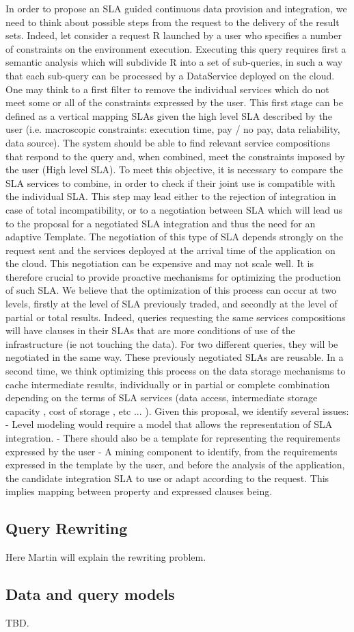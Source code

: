 In order to propose an SLA guided continuous data provision and integration, we need to think about possible steps from the request to the delivery of the result sets. Indeed, let consider a request R launched by a user who specifies a number of constraints on the environment execution. Executing this query requires first a semantic analysis which will subdivide R into a set of sub-queries, in such a way that each sub-query can be processed by a DataService deployed on the cloud. One may think to a first filter to remove the individual services which do not meet some or all of the constraints expressed by the user. This first stage can be defined as a vertical mapping SLAs given the high level SLA described by the user (i.e. macroscopic constraints: execution time, pay / no pay, data reliability, data source). The system should be able to find relevant service compositions that respond to the query and, when combined, meet the constraints imposed by the user (High level SLA).
To meet this objective, it is necessary to compare the SLA services to combine, in order to check if their joint use is compatible with the individual SLA. This step may lead either to the rejection of integration in case of total incompatibility, or to a negotiation between SLA which will lead us to the proposal for a negotiated SLA integration and thus the need for an adaptive Template.
The negotiation of this type of SLA depends strongly on the request sent and the services deployed at the arrival time of the application on the cloud. This negotiation can be expensive and may not scale well. It is therefore crucial to provide proactive mechanisms for optimizing the production of such SLA. We believe that the optimization of this process can occur at two levels, firstly at the level of SLA previously traded, and secondly at the level of partial or total results. Indeed, queries requesting the same services compositions will have clauses in their SLAs that are more conditions of use of the infrastructure (ie not touching the data). For two different queries, they will be negotiated in the same way. These previously negotiated SLAs are reusable.
In a second time, we think optimizing this process on the data storage mechanisms to cache intermediate results, individually or in partial or complete combination depending on the terms of SLA services (data access, intermediate storage capacity , cost of storage , etc ... ).
Given this proposal, we identify several issues:
- Level modeling would require a model that allows the representation of SLA integration.
- There should also be a template for representing the requirements expressed by the user
- A mining component to identify, from the requirements expressed in the template by the user, and before the analysis of the application, the candidate integration SLA to use or adapt according to the request. This implies mapping between property and expressed clauses being.

\subsection{Query Rewriting}
\label{sec:queryRew}

{\color{red}
Here Martin will explain the rewriting problem.
}

\subsection{Data and query models}
\label{sec:dqm}

TBD.
